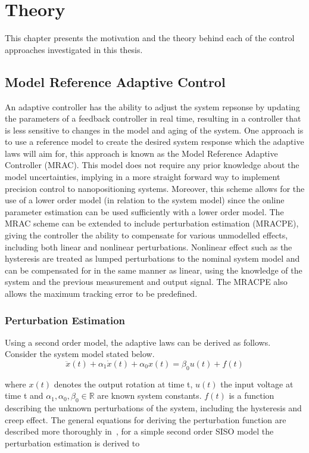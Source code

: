 \chapter{Theory}\label{cha:modelling}
This chapter presents the motivation and the theory behind each of the control approaches investigated in this thesis.

\section{Model Reference Adaptive Control}
An adaptive controller has the ability to adjust the system repsonse by updating the parameters of a feedback controller in real time, resulting in a controller that is less sensitive to changes in the model and aging of the system. One approach is to use a reference model to create the desired system response which the adaptive laws will aim for, this approach is known as the Model Reference Adaptive Controller (MRAC). This model does not require any prior knowledge about the model uncertainties, implying in a more straight forward way to implement precision control to nanopositioning systems. Moreover, this scheme allows for the use of a lower order model (in relation to the system model) since the online parameter estimation can be used sufficiently with a lower order model. The MRAC scheme can be extended to include perturbation estimation (MRACPE), giving the controller the ability to compensate for various unmodelled effects, including both linear and nonlinear perturbations. Nonlinear effect such as the hysteresis are treated as lumped perturbations to the nominal system model and can be compensated for in the same manner as linear, using the knowledge of the system and the previous measurement and output signal. The MRACPE also allows the maximum tracking error to be predefined.

\subsection{Perturbation Estimation}\label{sec:pertest}
Using a second order model, the adaptive laws can be derived as follows. Consider the system model stated below.
\begin{equation}
  \label{eq:sysmodel}
  \ddot{x}(t) + \alpha_1\dot{x}(t) +  \alpha_0x(t) = \beta_0u(t) + f(t)
\end{equation}

where $x(t)$ denotes the output rotation at time t, $u(t)$ the input voltage at time t and $\alpha_1, \alpha_0, \beta_0 \in \mathbb{R}$ are known system constants. $f(t)$ is a function describing the unknown perturbations of the system, including the hysteresis and creep effect. The general equations for deriving the perturbation function are described more thoroughly in~\cite{Elmali:1996}, for a simple second order SISO model the perturbation estimation is derived to

